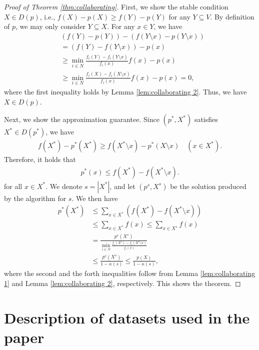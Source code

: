 \documentclass[letterpaper]{article}
\theoremstyle{definition}
\begin{document}
\begin{proof}[Proof of Theorem \ref{thm:collaborating}]
  First, we show the stable condition $X\in D(p)$, i.e.,
  \(f(X)-p(X)\ge f(Y)-p(Y)\) for any $Y\subseteq V$. %
  By definition of $p$, we may only consider $Y \subseteq X$.
  For any $x \in Y$, we have
\begin{align}
  &(f(Y) - p(Y)) - (f(Y \setminus x) - p(Y \setminus x)) \nonumber \\
  &=(f(Y) - f(Y \setminus x)) - p(x) \nonumber \\
  &\ge\min_{i\in N}\frac{f_i(Y)-f_i(Y\setminus x)}{f_i(x)}f(x) - p(x) \nonumber \\
  &\ge\min_{i\in N}\frac{f_i(X)-f_i(X\setminus x)}{f_i(x)}f(x) - p(x) = 0,
\end{align}
where the first inequality holds by Lemma \ref{lem:collaborating 2}.
Thus, we have \(X\in D(p)\).


Next, we show the approximation guarantee. %
Since $(p^*, X^*)$ satisfies $X^* \in D(p^*)$, we have
\begin{align}
  f(X^*) - p^*(X^*) \ge f(X^* \setminus x) - p^*(X \setminus x) \quad (x \in X^*).
\end{align}
Therefore, it holds that
\begin{align}
  p^*(x) \le f(X^*) - f(X^* \setminus x).
\end{align}
for all $x \in X^*$.
We denote $s = |X^*|$, and let $(p^s, X^s)$ be the solution produced by the algorithm for $s$.
We then have
\begin{align}
  p^*(X^*) 
  &\le \sum_{x \in X^*} \left( f(X^*) - f(X^* \setminus x) \right) \nonumber \\
  &\le \sum_{x \in X^*} f(x) \le \sum_{x \in X^s} f(x) \nonumber \\
  &= \frac{p^s(X^s)}{\min_{i\in N}\frac{f_i(X^s)-f_i(X^s\setminus x)}{f_i(x)}} \nonumber\\
  &\le \frac{p^s(X^s)}{1 - \kappa(s)}  \le \frac{p(X)}{1 - \kappa(s)}, 
\end{align}
where the second and the forth inequalities follow from Lemma \ref{lem:collaborating 1} and Lemma \ref{lem:collaborating 2}, respectively. 
This shows the theorem.
\end{proof}


\section{Description of datasets used in the paper}
\end{document}
